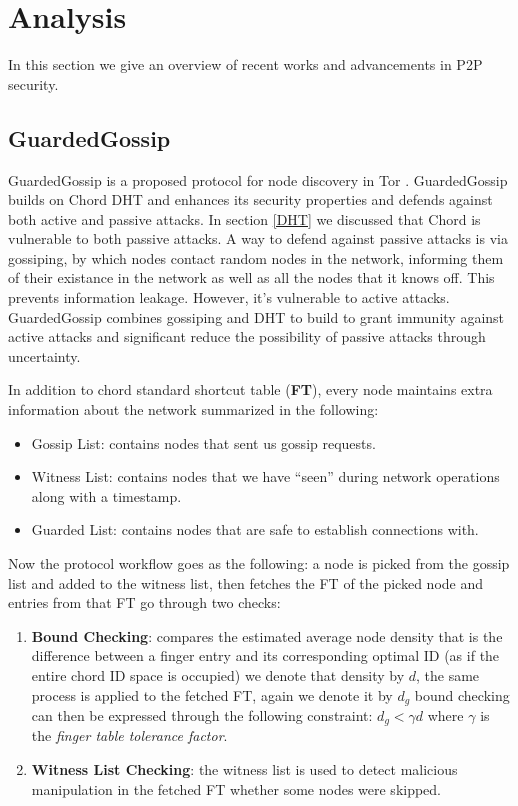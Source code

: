 \documentclass[12pt,twocolumn]{article}
\begin{document}
\section{Analysis}
In this section we give an overview of recent works and advancements in P2P security.

\subsection{GuardedGossip}
GuardedGossip is a proposed protocol for node discovery in Tor \cite{guarded_gossip}.
GuardedGossip builds on Chord DHT and enhances its security properties and defends against 
both active and passive attacks. In section \ref{DHT} we discussed that Chord is vulnerable to both passive attacks. 
A way to defend against passive attacks is via gossiping, by which nodes contact random nodes in the network, informing
them of their existance in the network as well as all the nodes that it knows off. This prevents information leakage. 
However, it's vulnerable to active attacks. GuardedGossip combines gossiping and DHT to build to grant immunity against
active attacks and significant reduce the possibility of passive attacks through uncertainty. 

In addition to chord standard shortcut table (\textbf{FT}), 
every node maintains extra information about the network summarized in the following:
\begin{itemize}
    \item Gossip List: contains nodes that sent us gossip requests.
    \item Witness List: contains nodes that we have ``seen'' during network operations along with a timestamp.
    \item Guarded List: contains nodes that are safe to establish connections with.
\end{itemize}

Now the protocol workflow goes as the following: a node is picked from the gossip list and added to the witness list,
then fetches the FT of the picked node and entries from that FT go through two checks:
\begin{enumerate}
    \item \textbf{Bound Checking}: compares the estimated average node density that is the difference between a finger entry and its corresponding optimal ID 
        (as if the entire chord ID space is occupied) we denote that density by $d$, the same process is applied to the fetched FT, again we denote it by $d_g$
        bound checking can then be expressed through the following constraint: $d_g < \gamma d$ where $\gamma$ is the \textit{finger table tolerance factor}.
    \item \textbf{Witness List Checking}: the witness list is used to detect malicious manipulation in the fetched FT whether some nodes were skipped.
\end{enumerate}
\end{document}
